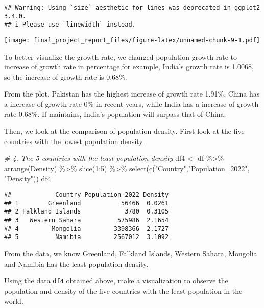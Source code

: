 \documentclass[
]{article}
\newenvironment{Shaded}{\begin{snugshade}}{\end{snugshade}}
\newcommand{\CommentTok}[1]{\textcolor[rgb]{0.56,0.35,0.01}{\textit{#1}}}
\newcommand{\DecValTok}[1]{\textcolor[rgb]{0.00,0.00,0.81}{#1}}
\newcommand{\FunctionTok}[1]{\textcolor[rgb]{0.00,0.00,0.00}{#1}}
\newcommand{\NormalTok}[1]{#1}
\newcommand{\OtherTok}[1]{\textcolor[rgb]{0.56,0.35,0.01}{#1}}
\newcommand{\SpecialCharTok}[1]{\textcolor[rgb]{0.00,0.00,0.00}{#1}}
\newcommand{\StringTok}[1]{\textcolor[rgb]{0.31,0.60,0.02}{#1}}
\begin{document}
\begin{verbatim}
## Warning: Using `size` aesthetic for lines was deprecated in ggplot2 3.4.0.
## i Please use `linewidth` instead.
\end{verbatim}

\texttt{[image: final\_project\_report\_files/figure-latex/unnamed-chunk-9-1.pdf]}

To better visualize the growth rate, we changed population growth rate
to increase of growth rate in percentage,for example, India's growth
rate is 1.0068, so the increase of growth rate is 0.68\%.

From the plot, Pakistan has the highest increase of growth rate 1.91\%.
China has a increase of growth rate 0\% in recent years, while India has
a increase of growth rate 0.68\%. If maintains, India's population will
surpass that of China.

Then, we look at the comparison of population density. First look at the
five countries with the lowest population density.

\begin{Shaded}
\begin{Highlighting}[]
\CommentTok{\# 4. The 5 countries with the least population density}
\NormalTok{df4 }\OtherTok{\textless{}{-}}\NormalTok{ df }\SpecialCharTok{\%\textgreater{}\%} \FunctionTok{arrange}\NormalTok{(Density) }\SpecialCharTok{\%\textgreater{}\%} \FunctionTok{slice}\NormalTok{(}\DecValTok{1}\SpecialCharTok{:}\DecValTok{5}\NormalTok{) }\SpecialCharTok{\%\textgreater{}\%}
  \FunctionTok{select}\NormalTok{(}\FunctionTok{c}\NormalTok{(}\StringTok{"Country"}\NormalTok{,}\StringTok{"Population\_2022"}\NormalTok{, }\StringTok{"Density"}\NormalTok{))}
\NormalTok{df4}
\end{Highlighting}
\end{Shaded}

\begin{verbatim}
##            Country Population_2022 Density
## 1        Greenland           56466  0.0261
## 2 Falkland Islands            3780  0.3105
## 3   Western Sahara          575986  2.1654
## 4         Mongolia         3398366  2.1727
## 5          Namibia         2567012  3.1092
\end{verbatim}

From the data, we know Greenland, Falkland Islands, Western Sahara,
Mongolia and Namibia has the least population density.

Using the data \texttt{df4} obtained above, make a visualization to
observe the population and density of the five countries with the least
population in the world.
\end{document}
